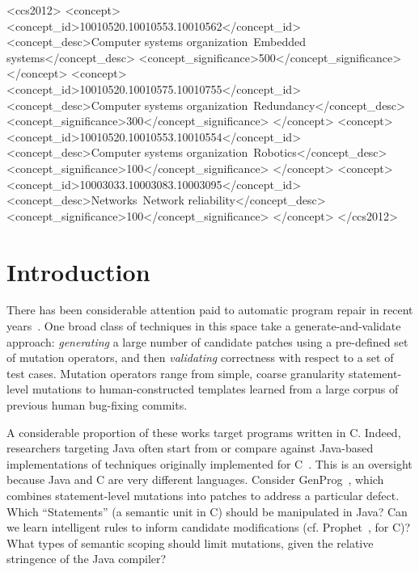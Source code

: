 \documentclass{sig-alternate-05-2015}
\begin{document}
%
%
\begin{CCSXML}
<ccs2012>
 <concept>
  <concept_id>10010520.10010553.10010562</concept_id>
  <concept_desc>Computer systems organization~Embedded systems</concept_desc>
  <concept_significance>500</concept_significance>
 </concept>
 <concept>
  <concept_id>10010520.10010575.10010755</concept_id>
  <concept_desc>Computer systems organization~Redundancy</concept_desc>
  <concept_significance>300</concept_significance>
 </concept>
 <concept>
  <concept_id>10010520.10010553.10010554</concept_id>
  <concept_desc>Computer systems organization~Robotics</concept_desc>
  <concept_significance>100</concept_significance>
 </concept>
 <concept>
  <concept_id>10003033.10003083.10003095</concept_id>
  <concept_desc>Networks~Network reliability</concept_desc>
  <concept_significance>100</concept_significance>
 </concept>
</ccs2012>  
\end{CCSXML}


%
%

%
%
\printccsdesc



\section{Introduction}

There has been considerable attention paid to automatic
program repair in recent
years~\cite{kim2013,legoues2012,pan2009,
  Mechtaev15,Long2016}.
%
One broad class of techniques in this space take a generate-and-validate
approach: \emph{generating} a large number of candidate patches using a
pre-defined set of mutation operators, and then \emph{validating} correctness with
respect to a set of test cases.  Mutation operators range from simple, coarse
granularity statement-level mutations to human-constructed templates learned
from a large corpus of previous human bug-fixing commits.

A considerable proportion of these works target programs written in C.
Indeed, researchers targeting Java often start from or compare against
Java-based implementations of techniques originally
implemented for C~\cite{nopol,kim2013}. %
%
This is an oversight because Java and C are very different languages.
Consider GenProg~\cite{legoues2012}, which
combines statement-level mutations into patches to address a particular
defect. Which ``Statements'' (a semantic unit in C) should be manipulated in Java?
Can we learn
intelligent rules to inform candidate modifications
(cf. Prophet~\cite{Long2016}, for C)?  What types of semantic scoping
should limit mutations, given the relative stringence of the Java
compiler?
\end{document}
